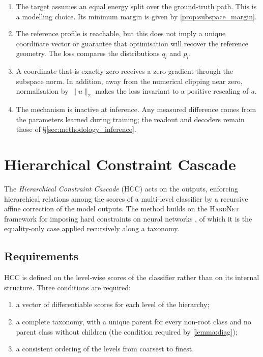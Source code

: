 \begin{enumerate}
    \item The target assumes an equal energy split over the ground-truth path.
    This is a modelling choice. Its minimum margin is given by
    \cref{prop:subspace_margin}.
    \item The reference profile is reachable, but this does not imply a unique
    coordinate vector or guarantee that optimisation will recover the reference
    geometry. The loss compares the distributions $q_l$ and $p_l$.
    \item A coordinate that is exactly zero receives a zero gradient through the
    subspace norm. In addition, away from the numerical clipping near zero,
    normalisation by $\lVert u\rVert_2$ makes the loss invariant to a positive
    rescaling of $u$.
    \item The mechanism is inactive at inference. Any measured difference comes
    from the parameters learned during training; the readout and decoders remain
    those of \S\ref{sec:methodology_inference}.
\end{enumerate}

\section{Hierarchical Constraint Cascade}
\label{sec:methodology_hcc}

The \emph{Hierarchical Constraint Cascade} (HCC) acts on the outputs, enforcing
hierarchical relations among the scores of a multi-level
classifier by a recursive affine correction of the model outputs. The method
builds on the \textsc{HardNet} framework for imposing hard constraints on neural
networks \cite{min2024hardnet}, of which it is the equality-only case applied
recursively along a taxonomy.

\subsection{Requirements}
\label{ssec:hcc_setting}

HCC is defined on the level-wise scores of the classifier rather than on its
internal structure. Three conditions are required:

\begin{enumerate}
    \item a vector of differentiable scores for each level of the hierarchy;
    \item a complete taxonomy, with a unique parent for every non-root class and
    no parent class without children (the condition required by
    \cref{lemma:diag});
    \item a consistent ordering of the levels from coarsest to finest.
\end{enumerate}

